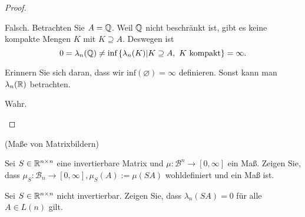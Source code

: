 \begin{proof}
	\begin{parts}
	\item Falsch. Betrachten Sie $A=\mathbb{Q}$. Weil $\mathbb{Q}$ nicht beschränkt ist, gibt es keine kompakte Mengen $K$ mit $K\supseteq A$. Deswegen ist 
		\[0=\lambda_n(\mathbb{Q})\neq\text{inf}\left\{ \lambda_n(K)|K\supseteq A,~K\text{ kompakt} \right\}=\infty.\] 
		\begin{tcolorbox}[title=Bemerkung]
			Erinnern Sie sich daran, dass wir $\text{inf}(\varnothing)=\infty$ definieren. Sonst kann man $\lambda_n(\mathbb{R})$ betrachten.
		\end{tcolorbox}
	\item Wahr. 
	\end{parts}
\end{proof}
\begin{Problem}
	(Maße von Matrixbildern) 
	\begin{parts}
	\item Sei $S \in \mathbb{R}^{n\times n}$ eine invertierbare Matrix und $\mu : \mathcal{B}^n \to [0, \infty]$ ein Maß. Zeigen Sie, dass $\mu_S : \mathcal{B}_n\to [0,\infty],\mu_S(A):=\mu(SA)$ wohldefiniert und ein Maß ist.
	\item Sei $S \in \mathbb{R}^{n\times n}$ nicht invertierbar. Zeigen Sie, dass $\lambda_n(SA)=0$ für alle $A \in L(n)$ gilt.
	\end{parts}
\end{Problem}
